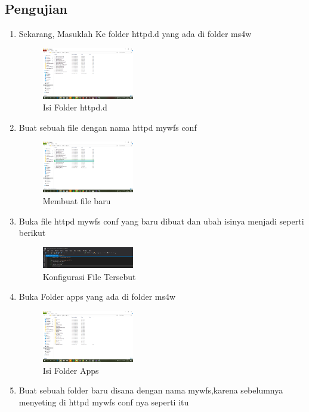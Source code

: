 \subsection{Pengujian}
\begin{enumerate}
  \item Sekarang, Masuklah Ke folder httpd.d yang ada di folder ms4w
  \hfill\break
    \begin{figure}[H]
		\includegraphics[width=4cm]{figures/tugas4/1174054/16.png}
		\centering
		\caption{Isi Folder httpd.d}
    \end{figure}
  \item Buat sebuah file dengan nama httpd mywfs conf
  \hfill\break
    \begin{figure}[H]
		\includegraphics[width=4cm]{figures/tugas4/1174054/17.png}
		\centering
		\caption{Membuat file baru}
    \end{figure}
  \item Buka file httpd mywfs conf yang baru dibuat dan ubah isinya menjadi seperti berikut
  \hfill\break
    \begin{figure}[H]
		\includegraphics[width=4cm]{figures/tugas4/1174054/18.png}
		\centering
		\caption{Konfigurasi File Tersebut}
    \end{figure}
  \item Buka Folder apps yang ada di folder ms4w
  \hfill\break
    \begin{figure}[H]
		\includegraphics[width=4cm]{figures/tugas4/1174054/19.png}
		\centering
		\caption{Isi Folder Apps}
    \end{figure}
  \item Buat sebuah folder baru disana dengan nama mywfs,karena sebelumnya menyeting di httpd mywfs conf nya seperti itu

\end{enumerate}
